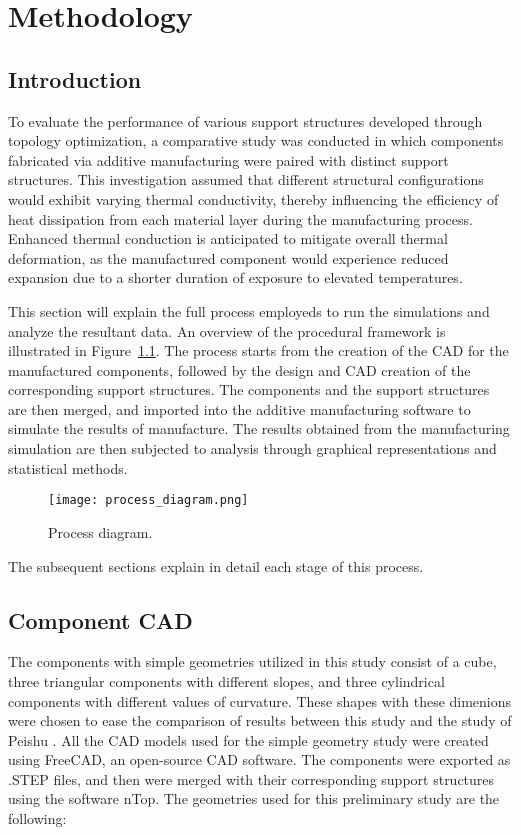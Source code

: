 \documentclass[../main.tex]{subfiles}
\begin{document}
	
\chapter{Methodology}
\section{Introduction}

To evaluate the performance of various support structures developed through topology optimization, a comparative study was conducted in which components fabricated via additive manufacturing were paired with distinct support structures. This investigation assumed that different structural configurations would exhibit varying thermal conductivity, thereby influencing the efficiency of heat dissipation from each material layer during the manufacturing process. Enhanced thermal conduction is anticipated to mitigate overall thermal deformation, as the manufactured component would experience reduced expansion due to a shorter duration of exposure to elevated temperatures.

This section will explain the full process employeds to run the simulations and analyze the resultant data. An overview of the procedural framework is illustrated in Figure~\ref{fig:process_diagram}. The process starts from the creation of the CAD for the manufactured components, followed by the design and CAD creation of the corresponding support structures. The components and the support structures are then merged, and imported into the additive manufacturing software to simulate the results of manufacture. The results obtained from the manufacturing simulation are then subjected to analysis through graphical representations and statistical methods.

\begin{figure}
  \begin{center}
    \texttt{[image: process\_diagram.png]}
  \end{center}
  \caption{Process diagram.}\label{fig:process_diagram}
\end{figure}

The subsequent sections explain in detail each stage of this process.

\section{Component CAD}

The components with simple geometries utilized in this study consist of a cube, three triangular
components with different slopes, and three cylindrical components with different values of
curvature. These shapes with these dimenions were chosen to ease the comparison of results between this study and the study of Peishu \cite{chungpei-hsuStudyLatticeSupport2024}. All the CAD models
used for the simple geometry study were created using FreeCAD, an open-source CAD software. The components were exported as .STEP files, and then were merged with their corresponding support structures using the software nTop. The geometries used for this preliminary study are the following:
\end{document}
